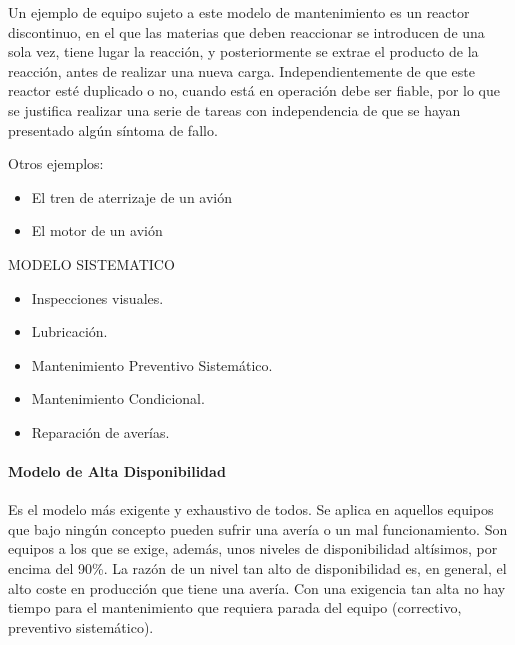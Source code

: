 Un ejemplo de equipo sujeto a este modelo de mantenimiento es un reactor discontinuo, en el que las materias que deben reaccionar se introducen
de una sola vez, tiene lugar la reacción, y posteriormente se extrae el producto
de la reacción, antes de realizar una nueva carga. Independientemente de que
este reactor esté duplicado o no, cuando está en operación debe ser fiable, por
lo que se justifica realizar una serie de tareas con independencia de que se hayan presentado algún síntoma de fallo.

Otros ejemplos:
\begin{itemize}
    \item El tren de aterrizaje de un avión
    \item El motor de un avión
\end{itemize}

\begin{tcolorbox}
MODELO SISTEMATICO
\tcblower
\begin{itemize}
\item Inspecciones visuales.
\item Lubricación.
\item Mantenimiento Preventivo Sistemático.
\item Mantenimiento Condicional.
\item Reparación de averías.
\end{itemize}
\end{tcolorbox}

\paragraph{Modelo de Alta Disponibilidad}

Es el modelo más exigente y exhaustivo de todos. Se aplica en aquellos
equipos que bajo ningún concepto pueden sufrir una avería o un mal funcionamiento. Son equipos a los que se exige, además, unos niveles de disponibilidad altísimos, por encima del 90\%. La razón de un nivel tan alto de
disponibilidad es, en general, el alto coste en producción que tiene una avería. Con una exigencia tan alta no hay tiempo para el mantenimiento que requiera parada del equipo (correctivo, preventivo sistemático).


